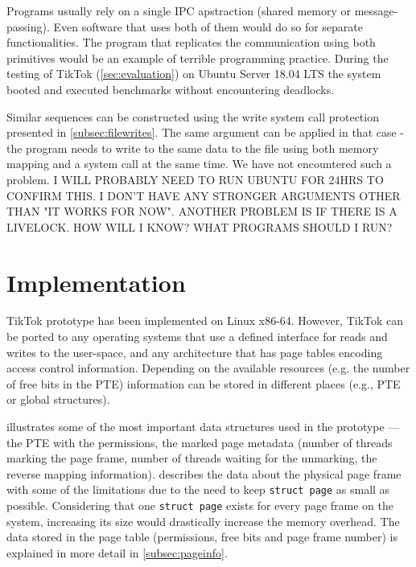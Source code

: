
Programs usually rely on a single IPC apstraction (shared memory or
message-passing). Even software that uses both of them would do so for separate
functionalities. The program that replicates the communication using both
primitives would be an example of terrible programming practice. During the
testing of TikTok (\cref{sec:evaluation}) on Ubuntu Server 18.04 LTS the system
booted and executed benchmarks without encountering deadlocks.

Similar sequences can be constructed using the write system call protection
presented in \cref{subsec:filewrites}. The same argument can be applied in that
case - the program needs to write to the same data to the file using both memory
mapping and a system call at the same time. We have not encountered such a
problem. I WILL PROBABLY NEED TO RUN UBUNTU FOR 24HRS TO CONFIRM THIS. I DON'T HAVE
ANY STRONGER ARGUMENTS OTHER THAN "IT WORKS FOR NOW". ANOTHER PROBLEM IS IF THERE IS
A LIVELOCK. HOW WILL I KNOW? WHAT PROGRAMS SHOULD I RUN?


\section{Implementation}
\label{sec:implementation}

TikTok prototype has been implemented on Linux x86-64. However, TikTok can be
ported to any operating systems that use a defined interface for reads and
writes to the user-space, and any architecture that has page tables
encoding access control information. Depending on the available resources
(e.g. the number of free bits in the PTE)
information can be stored in different places (e.g., PTE or global structures).

 illustrates some of the most important data structures
used in the prototype --- the PTE with the permissions, the marked page metadata
(number of threads marking the page frame, number of threads waiting for the
unmarking, the reverse mapping information).
 describes the data about the
physical page frame with some of the limitations due to the need to keep
\texttt{struct page} as small as possible. Considering that one \texttt{struct
page} exists for every page frame on the system, increasing its size would
drastically increase the memory overhead.  The data stored in the page table
(permissions, free bits and page frame number) is explained in more detail in
\cref{subsec:pageinfo}.

